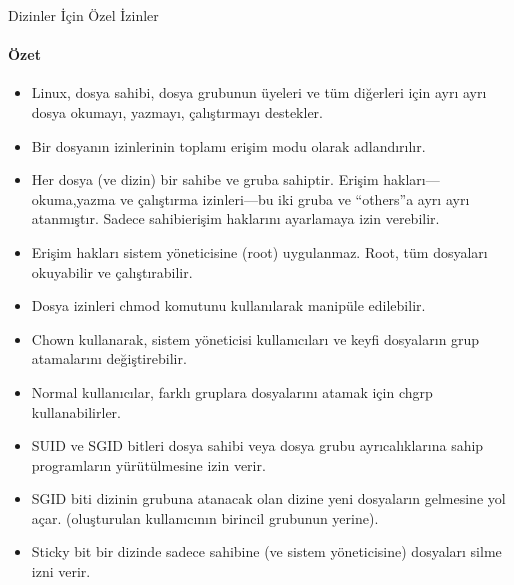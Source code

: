 \begin{section}{Dizinler İçin Özel İzinler}
\paragraph{Özet}{
\begin{itemize}
\item Linux, dosya sahibi, dosya grubunun üyeleri ve tüm diğerleri için ayrı ayrı dosya okumayı, yazmayı, çalıştırmayı destekler.
\item Bir dosyanın izinlerinin toplamı erişim modu olarak adlandırılır.
\item Her dosya (ve dizin) bir sahibe ve gruba sahiptir. Erişim hakları—okuma,yazma ve çalıştırma izinleri—bu iki gruba ve “others”a ayrı ayrı atanmıştır. Sadece sahibierişim haklarını ayarlamaya izin verebilir.
\item Erişim hakları sistem yöneticisine (root) uygulanmaz. Root, tüm dosyaları okuyabilir ve çalıştırabilir.
\item Dosya izinleri chmod komutunu kullanılarak manipüle edilebilir.
\item Chown kullanarak, sistem yöneticisi kullanıcıları ve keyfi dosyaların grup atamalarını değiştirebilir.
\item Normal kullanıcılar, farklı gruplara dosyalarını atamak için chgrp kullanabilirler.
\item SUID ve SGID bitleri dosya sahibi veya dosya grubu ayrıcalıklarına sahip programların yürütülmesine izin verir.
\item SGID biti dizinin grubuna atanacak olan dizine yeni dosyaların gelmesine yol açar. (oluşturulan kullanıcının birincil grubunun yerine).
\item Sticky bit bir dizinde sadece sahibine (ve sistem yöneticisine) dosyaları silme izni verir. 
\end{itemize}
}
\end{section}
